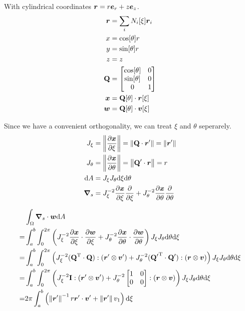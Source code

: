 \documentclass[a4paper,11pt]{article}
\renewcommand{\to}[1]{\text{\boldmath $#1$}} %
\newcommand{\ts}[1]{\text{\boldmath $\rm #1$}} %
\newcommand{\intd}[1]{{\rm d}#1}
\newcommand{\pderiv}[2]{\frac{\partial#1}{\partial#2}}
\newcommand{\norm}[1]{\left\lVert{#1}\right\rVert}
\newcommand{\T}{{\rm T}}
\begin{document}
With cylindrical coordinates $\to r = r\to e_r + z \to e_z$.
\begin{align}
 \to r &= \sum_i N_i[\xi]\to r_i\\
 x &= \cos[\theta] r\\
 y &= \sin[\theta] r\\
 z &= z\\
 \ts Q &= \begin{bmatrix}\cos[\theta] & 0\\ \sin[\theta] & 0\\ 0 & 1\end{bmatrix}\\
 \to x &= \ts Q[\theta] \cdot \to r[\xi]\\
 \to w &= \ts Q[\theta] \cdot \to v[\xi]
\end{align}

Since we have a convenient orthogonality, we can treat $\xi$ and $\theta$ seperarely.
\begin{align}
 J_\xi &= \norm{\pderiv{\to x}{\xi}} = \norm{\ts Q \cdot \to r'} = \norm{\to r'}\\
 J_\theta &= \norm{\pderiv{\to x}{\theta}} = \norm{\ts Q' \cdot \to r} = r \\
 \intd A &= J_\xi J_\theta \intd \xi \intd \theta \\
 \to\nabla_s &= J_\xi^{-2} \pderiv{\to x}{\xi}\pderiv{}{\xi} + J_\theta^{-2} \pderiv{\to x}{\theta}\pderiv{}{\theta}
\end{align}

\begin{align}
 &\int_\Omega\to \nabla_s\cdot\to w\intd A\\
=&\int_a^b\int_0^{2\pi}\left( J_\xi^{-2} \pderiv{\to x}{\xi}\cdot\pderiv{\to w}{\xi} +
                              J_\theta^{-2} \pderiv{\to x}{\theta}\cdot\pderiv{\to w}{\theta}
  \right) J_\xi J_\theta \intd \theta \intd \xi\\
=&\int_a^b\int_0^{2\pi}\left(
	  J_\xi^{-2} (\ts Q^\T\cdot\ts Q):(\to r'\otimes \to v') +
	  J_\theta^{-2} ({\ts Q'}^\T\cdot\ts Q'):(\to r\otimes\to v)
  \right) J_\xi J_\theta \intd \theta \intd \xi\\
=&\int_a^b\int_0^{2\pi}\left(
	  J_\xi^{-2} \ts I :(\to r'\otimes \to v') +
	  J_\theta^{-2} \begin{bmatrix}1&0\\0&0\end{bmatrix}:(\to r \otimes \to v)
  \right) J_\xi J_\theta \intd \theta \intd \xi\\
=&2\pi\int_a^b\left(
	  \norm{\to r'}^{-1} r \to r' \cdot \to v' +
	  \norm{\to r'} v_1
  \right) \intd \xi
\end{align}
\end{document}

